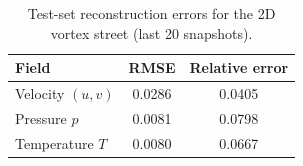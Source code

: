 \begin{table}[htbp]
  \centering
  \caption{Test-set reconstruction errors for the 2D vortex street (last 20 snapshots).}
  \label{tab:et:vortex-errors}
  \begin{tabular}{lcc}
    \toprule
    Field & RMSE & Relative error \\
    \midrule
    Velocity $(u,v)$ & 0.0286 & 0.0405 \\
    Pressure $p$     & 0.0081 & 0.0798 \\
    Temperature $T$  & 0.0080 & 0.0667 \\
    \bottomrule
  \end{tabular}
\end{table}
